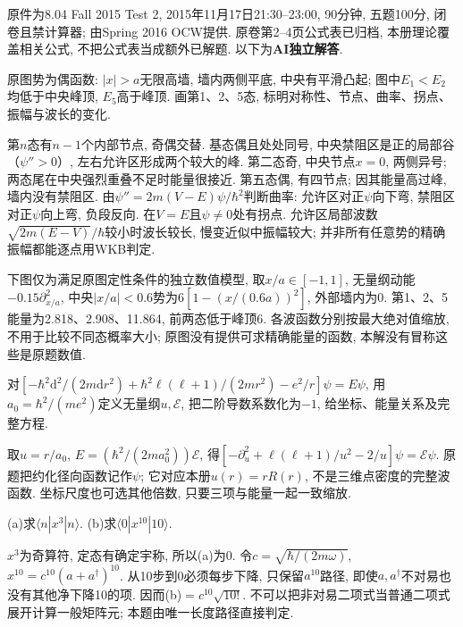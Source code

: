 原件为8.04 Fall 2015 Test 2, 2015年11月17日21:30--23:00, 90分钟, 五题100分, 闭卷且禁计算器; 由Spring 2016 OCW提供. 原卷第2--4页公式表已归档, 本册理论覆盖相关公式, 不把公式表当成额外已解题. 以下为\textbf{AI独立解答}.
\begin{exercise}
原图势为偶函数: $|x|>a$无限高墙, 墙内两侧平底, 中央有平滑凸起; 图中$E_1<E_2$均低于中央峰顶, $E_5$高于峰顶. 画第1、2、5态, 标明对称性、节点、曲率、拐点、振幅与波长的变化.
\end{exercise}
\begin{solution}
第$n$态有$n-1$个内部节点, 奇偶交替. 基态偶且处处同号, 中央禁阻区是正的局部谷（$\psi''>0$）, 左右允许区形成两个较大的峰. 第二态奇, 中央节点$x=0$, 两侧异号; 两态尾在中央强烈重叠不足时能量很接近. 第五态偶, 有四节点; 因其能量高过峰, 墙内没有禁阻区. 由$\psi''=2m(V-E)\psi/\hbar^2$判断曲率: 允许区对正$\psi$向下弯, 禁阻区对正$\psi$向上弯, 负段反向. 在$V=E$且$\psi\neq0$处有拐点. 允许区局部波数$\sqrt{2m(E-V)}/\hbar$较小时波长较长, 慢变近似中振幅较大; 并非所有任意势的精确振幅都能逐点用WKB判定.

下图仅为满足原图定性条件的独立数值模型, 取$x/a\in[-1,1]$, 无量纲动能$-0.15\partial_{x/a}^2$, 中央$|x/a|<0.6$势为$6[1-(x/(0.6a))^2]$, 外部墙内为0. 第1、2、5能量为2.818、2.908、11.864, 前两态低于峰顶6. 各波函数分别按最大绝对值缩放, 不用于比较不同态概率大小; 原图没有提供可求精确能量的函数, 本解没有冒称这些是原题数值.



\end{solution}
\begin{exercise}
对$[-\hbar^2\mathrm d^2/(2m\mathrm dr^2)+\hbar^2\ell(\ell+1)/(2mr^2)-e^2/r]\psi=E\psi$, 用$a_0=\hbar^2/(me^2)$定义无量纲$u,\mathcal E$, 把二阶导数系数化为$-1$, 给坐标、能量关系及完整方程.
\end{exercise}
\begin{solution}
取$u=r/a_0$, $E=(\hbar^2/(2ma_0^2))\mathcal E$, 得$[-\partial_u^2+\ell(\ell+1)/u^2-2/u]\psi=\mathcal E\psi$. 原题把约化径向函数记作$\psi$; 它对应本册$u(r)=rR(r)$, 不是三维点密度的完整波函数. 坐标尺度也可选其他倍数, 只要三项与能量一起一致缩放.
\end{solution}
\begin{exercise}
(a)求$\langle n|x^3|n\rangle$. (b)求$\langle0|x^{10}|10\rangle$.
\end{exercise}
\begin{solution}
$x^3$为奇算符, 定态有确定宇称, 所以(a)为0. 令$c=\sqrt{\hbar/(2m\omega)}$, $x^{10}=c^{10}(a+a^\dagger)^{10}$. 从10步到0必须每步下降, 只保留$a^{10}$路径, 即使$a,a^\dagger$不对易也没有其他净下降10的项. 因而(b)$=c^{10}\sqrt{10!}$. 不可以把非对易二项式当普通二项式展开计算一般矩阵元; 本题由唯一长度路径直接判定.
\end{solution}
